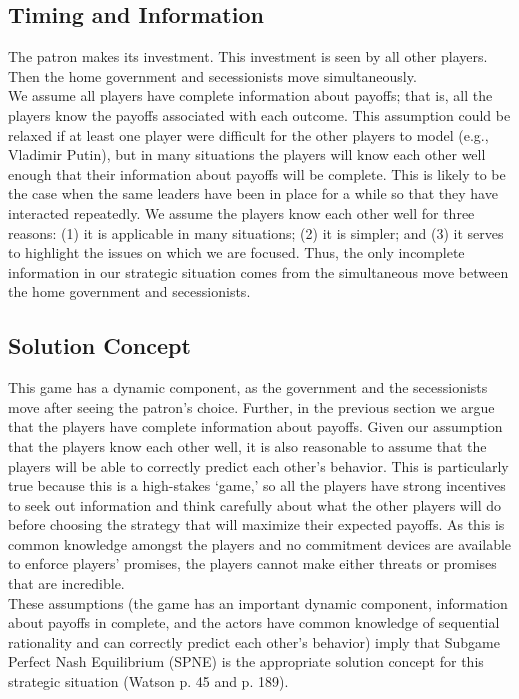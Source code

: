 \documentclass[12pt]{article}
\begin{document}
\subsection{Timing and Information}
The patron makes its investment. This investment is seen by all other players. Then the home government and secessionists move simultaneously.\\

We assume all players have complete information about payoffs; that is, all the players know the payoffs associated with each outcome. This assumption could be relaxed if at least one player were difficult for the other players to model (e.g., Vladimir Putin), but in many situations the players will know each other well enough that their information about payoffs will be complete. This is likely to be the case when the same leaders have been in place for a while so that they have interacted repeatedly. We assume the players know each other well for three reasons: (1) it is applicable in many situations; (2) it is simpler; and (3) it serves to highlight the issues on which we are focused. Thus, the only incomplete information in our strategic situation comes from the simultaneous move between the home government and secessionists.


\subsection{Solution Concept}
This game has a dynamic component, as the government and the secessionists move after seeing the patron's choice. Further, in the previous section we argue that the players have complete information about payoffs. Given our assumption that the players know each other well, it is also reasonable to assume that the players will be able to correctly predict each other's behavior. This is particularly true because this is a high-stakes `game,' so all the players have strong incentives to seek out information and think carefully about what the other players will do before choosing the strategy that will maximize their expected payoffs. As this is common knowledge amongst the players and no commitment devices are available to enforce players' promises, the players cannot make either threats or promises that are incredible. \\

These assumptions (the game has an important dynamic component, information about payoffs in complete, and the actors have common knowledge of sequential rationality and can correctly predict each other's behavior) imply that Subgame Perfect Nash Equilibrium (SPNE) is the appropriate solution concept for this strategic situation (Watson p. 45 and p. 189).
\end{document}
